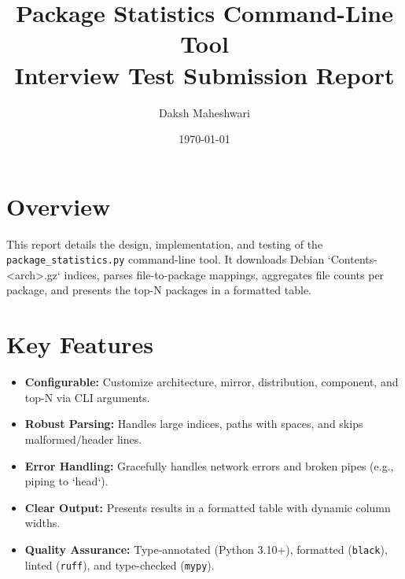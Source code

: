 \documentclass[10pt,a4paper]{article}
\title{Package Statistics Command-Line Tool \\ \large Interview Test Submission Report}
\author{Daksh Maheshwari}
\date{\today}
\begin{document}
\pagestyle{empty}
\small %
\maketitle
\vspace{-1.5em} %

\section*{Overview}
\vspace{-0.5em} %
This report details the design, implementation, and testing of the \texttt{package\_statistics.py} command-line tool. It downloads Debian `Contents-<arch>.gz` indices, parses file-to-package mappings, aggregates file counts per package, and presents the top-N packages in a formatted table.

\section*{Key Features}
\vspace{-0.5em}
\begin{itemize}
	\item \textbf{Configurable:} Customize architecture, mirror, distribution, component, and top-N via CLI arguments.
	\item \textbf{Robust Parsing:} Handles large indices, paths with spaces, and skips malformed/header lines.
	\item \textbf{Error Handling:} Gracefully handles network errors and broken pipes (e.g., piping to `head`).
	\item \textbf{Clear Output:} Presents results in a formatted table with dynamic column widths.
	\item \textbf{Quality Assurance:} Type-annotated (Python 3.10+), formatted (\texttt{black}), linted (\texttt{ruff}), and type-checked (\texttt{mypy}).
\end{itemize}
\end{document}
